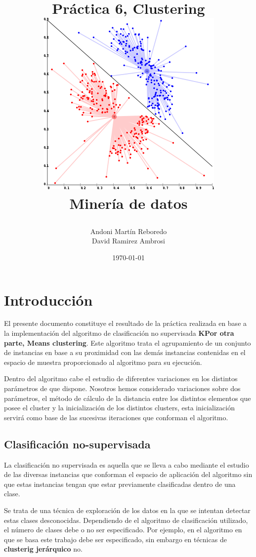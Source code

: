 \documentclass[a4paper]{report}
\author{Andoni Martín Reboredo \\ David Ramirez Ambrosi}
\title{\begin{center}
\textbf{\Huge{Práctica 6, Clustering}} \\ \includegraphics{./Figuras/KMeans-density-data.png}\\  \textbf{Minería de datos}
\end{center}}
\date{\today}
\begin{document}
\maketitle

\thispagestyle{empty}%
\newpage
\tableofcontents%
\thispagestyle{empty}
\newpage

\listoffigures%
\thispagestyle{empty}
\newpage

\setcounter{page}{1}%


\chapter{Introducción}

El presente documento constituye el resultado de la práctica realizada en base a la implementación del algoritmo de clasificación no supervisada \textbf{KPor otra parte, Means clustering}. Este algoritmo trata el agrupamiento de un conjunto de instancias en base a su proximidad con las demás instancias contenidas en el espacio de muestra proporcionado al algoritmo para su ejecución.

Dentro del algoritmo cabe el estudio de diferentes variaciones en los distintos parámetros de que dispone. Nosotros hemos considerado variaciones sobre dos parámetros, el método de cálculo de la distancia entre los distintos elementos que posee el cluster y la inicialización de los distintos clusters, esta inicialización servirá como base de las sucesivas iteraciones que conforman el algoritmo.

	\section{Clasificación no-supervisada}
	La clasificación no supervisada es aquella que se lleva a cabo mediante el estudio de las diversas instancias que conforman el espacio de aplicación del algoritmo sin que estas instancias tengan que estar previamente clasificadas dentro de una clase.
	
	Se trata de una técnica de exploración de los datos en la que se intentan detectar estas clases desconocidas. Dependiendo de el algoritmo de clasificación utilizado, el número de clases debe o no ser especificado. Por ejemplo, en el algoritmo en que se basa este trabajo debe ser especificado, sin embargo en técnicas de \textbf{clusterig jerárquico} no.
	
\end{document}
